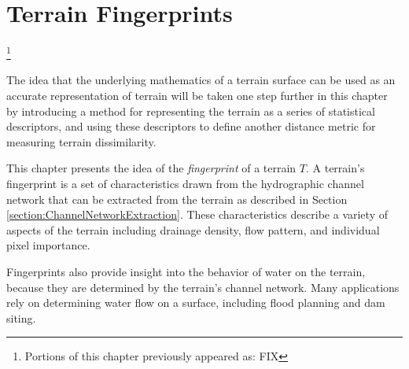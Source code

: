 \chapter{Terrain Fingerprints}
\label{chapter:FingerprintingATerrain}




\let\thefootnote\relax\footnote{Portions of this chapter previously appeared as: FIX  }







The idea that the underlying mathematics of a terrain surface can be used as an accurate representation of terrain will be taken one step further in this chapter by introducing a method for representing the terrain as a series of statistical descriptors, and using these descriptors to define another distance metric for measuring terrain dissimilarity.

This chapter presents the idea of the \emph{fingerprint} of a terrain $T$. A terrain's fingerprint is a set of characteristics 
 drawn from the hydrographic channel network that can be extracted from the terrain as described in Section \ref{section:ChannelNetworkExtraction}. 
These characteristics describe a variety of aspects of the terrain including 
drainage density, flow pattern, and individual pixel importance.


% 
Fingerprints also provide insight into the behavior of water on the terrain, because they are determined by the terrain's channel network. Many applications rely on determining water flow on a surface, including flood planning and dam siting. 

